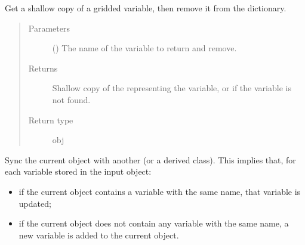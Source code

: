 \documentclass[letterpaper,10pt,english]{sphinxmanual}
\begin{document}
\begin{fulllineitems}
\begin{fulllineitems}
\begin{quote}
\begin{description}
\end{description}\end{quote}

\end{fulllineitems}


\begin{fulllineitems}
\label{\detokenize{api:storages.grid_data.GridData.pop}}
Get a shallow copy of a gridded variable, then remove it from the dictionary.
\begin{quote}\begin{description}
\item[{Parameters}] \leavevmode
{} () \textendash{} The name of the variable to return and remove.

\item[{Returns}] \leavevmode
Shallow copy of the  representing the variable, or  if the variable is not found.

\item[{Return type}] \leavevmode
obj

\end{description}\end{quote}

\end{fulllineitems}


\begin{fulllineitems}
\label{\detokenize{api:storages.grid_data.GridData.update}}
Sync the current object with another {\hyperref[\detokenize{api:storages.grid_data.GridData}]{}} (or a derived class).
This implies that, for each variable stored in the input object:
\begin{itemize}
\item {} 
if the current object contains a variable with the same name, that variable is updated;

\item {} 
if the current object does not contain any variable with the same name, a new variable is added to the current object.


\end{itemize}
\end{fulllineitems}
\end{fulllineitems}
\end{document}
